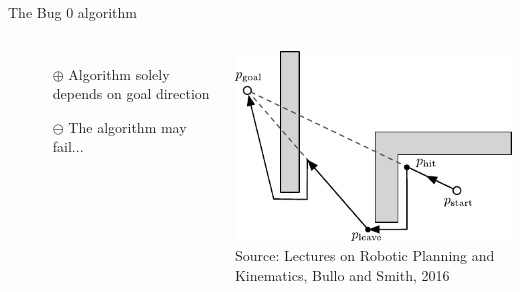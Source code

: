 \documentclass[aspectratio=169]{beamer}
\begin{document}



\begin{frame}{The Bug 0 algorithm}
	\begin{columns}[c]
		\begin{minipage}{\textwidth}\begin{algorithmic}[1]
					\EndWhile
				\EndIf
			\EndWhile
		\end{algorithmic}\end{minipage}
		\vspace{0.5cm}
		\begin{itemize}
			\item[\color{chameleon3}$\oplus$] Algorithm solely depends on goal direction
			\item[$\ominus$] The algorithm may fail...
		\end{itemize}
		\includegraphics[width=\textwidth]{media/bug_0_sketch.pdf}\\
		\footnotesize\textcolor{aluminium4}{Source: Lectures on Robotic Planning and Kinematics, Bullo and Smith, 2016}
	\end{columns}
\end{frame}

\end{document}
